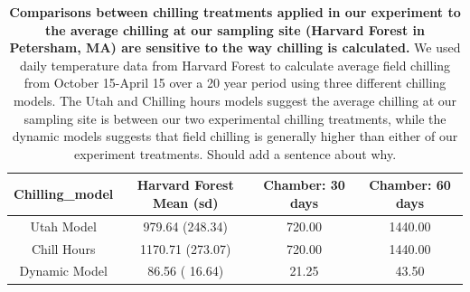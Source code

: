 \documentclass[11pt]{article}
\begin{document}
\begin{table}[ht]
\begin{tabular}{cccc}
  \hline
 Chilling\_model & Harvard Forest Mean (sd) & Chamber: 30 days & Chamber: 60 days \\ 
  \hline
 Utah Model & 979.64  (248.34) & 720.00 & 1440.00 \\ 
Chill Hours & 1170.71 (273.07) & 720.00 & 1440.00 \\ 
 Dynamic Model & 86.56 ( 16.64) & 21.25 & 43.50 \\ 
   \hline
\end{tabular}
\caption{\textbf{Comparisons between chilling treatments applied in our experiment to the average chilling at our sampling site (Harvard Forest in Petersham, MA)  are sensitive to the way chilling is calculated.} We used daily temperature data from Harvard Forest \citep{} to calculate average field chilling from October 15-April 15 over a 20 year period using three different chilling models. The Utah and Chilling hours models suggest the average chilling at our sampling site is between our two experimental chilling treatments, while the dynamic models suggests that field chilling is generally higher than either of our experiment treatments. Should add a sentence about why.}
\label{tab:chillcomps}
\end{table}
\end{document}
